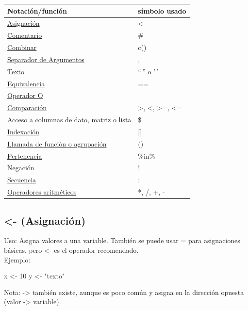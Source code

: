 \documentclass[
]{book}
\newenvironment{Shaded}{\begin{snugshade}}{\end{snugshade}}
\newcommand{\DecValTok}[1]{\textcolor[rgb]{0.00,0.00,0.81}{#1}}
\newcommand{\NormalTok}[1]{#1}
\newcommand{\OtherTok}[1]{\textcolor[rgb]{0.56,0.35,0.01}{#1}}
\newcommand{\StringTok}[1]{\textcolor[rgb]{0.31,0.60,0.02}{#1}}
\begin{document}
\begin{longtable}[]{@{}ll@{}}
\toprule\noalign{}
Notación/función & símbolo usado \\
\midrule\noalign{}
\endhead
\bottomrule\noalign{}
\endlastfoot
\hyperref[asignaciuxf3n]{Asignación} & \textless- \\
\hyperref[comentario]{Comentario} & \# \\
\hyperref[combinar]{Combinar} & c() \\
\hyperref[separador]{Separador de Argumentos} & , \\
\hyperref[texto]{Texto} & ``\,'' o '\,' \\
\hyperref[equivalencia]{Equivalencia} & == \\
\hyperref[OR]{Operador O} & \textbar{} \\
\hyperref[comparaciuxf3n]{Comparación} & \textgreater, \textless, \textgreater=, \textless= \\
\hyperref[acceso]{Acceso a columnas de dato, matriz o lista} & \$ \\
\hyperref[indexaciuxf3n]{Indexación} & {[}{]} \\
\hyperref[llamada]{Llamada de función o agrupación} & () \\
\hyperref[pertenencia]{Pertenencia} & \%in\% \\
\hyperref[negaciuxf3n]{Negación} & ! \\
\hyperref[secuencia]{Secuencia} & : \\
\hyperref[aritmeticos]{Operadores aritméticos} & *, /, +, - \\
\end{longtable}

\subsection{\textless- (Asignación)}\label{asignaciuxf3n}

Uso: Asigna valores a una variable. También se puede usar = para asignaciones básicas, pero \textless- es el operador recomendado.\\
Ejemplo:

\begin{Shaded}
\begin{Highlighting}[]
\NormalTok{x }\OtherTok{\textless{}{-}} \DecValTok{10}
\NormalTok{y }\OtherTok{\textless{}{-}} \StringTok{"texto"}
\end{Highlighting}
\end{Shaded}

Nota: -\textgreater{} también existe, aunque es poco común y asigna en la dirección opuesta (valor -\textgreater{} variable).
\end{document}
